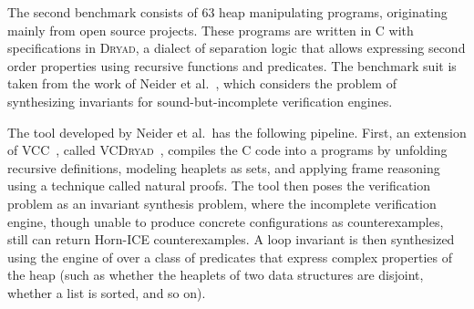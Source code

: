 The second benchmark consists of $63$ heap manipulating programs, originating mainly from open source projects.
These programs are written in C with specifications in \textsc{Dryad}, a dialect of separation logic that allows expressing second order properties using recursive functions and predicates.
The benchmark suit is taken from the work of Neider et al.~\cite{DBLP:conf/tacas/Neider0MS018}, which considers the problem of synthesizing invariants for sound-but-incomplete verification engines.
 
The tool developed by Neider et al.\ has the following pipeline.
First, an extension of \textsc{VCC}~\cite{vcc}, called \textsc{VCDryad}~\cite{vcdryad}, compiles the C code into a \boogie programs by unfolding recursive definitions, modeling heaplets as sets, and applying frame reasoning using a technique called natural proofs.
The tool then poses the verification problem as an invariant synthesis problem, where the incomplete verification engine, though unable to produce concrete configurations as counterexamples, still can return Horn-ICE counterexamples. 
A loop invariant is then synthesized using the \houdini engine of \boogie over a class of predicates that express complex properties of the heap (such as whether the heaplets of two data structures are disjoint, whether a list is sorted, and so on).

